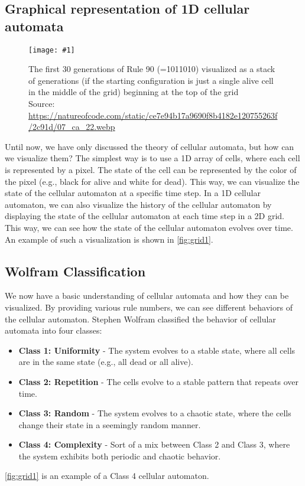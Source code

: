 \documentclass[a4paper,12pt]{llncs}
\numberwithin{equation}{section}
\newcommand{\imagewithwidth}[5]{
  \begin{figure}[htbp]%
    \begin{center}%
      \texttt{[image: \#1]}%
      \caption[#5]{#4}%
      \label{#3}%
    \end{center}%
  \end{figure}
}
\begin{document}
\subsection{Graphical representation of 1D cellular automata}
\imagewithwidth{figures/rule90}{\textwidth}{fig:grid1}{The first 30 generations of Rule 90 (=1011010) visualized as a stack of generations (if the starting configuration is just a single alive cell in the middle of the grid) beginning at the top of the grid\\Source: \url{https://natureofcode.com/static/ce7e94b17a9690f8b4182e120755263f/2c91d/07_ca_22.webp}}{}
Until now, we have only discussed the theory of cellular automata, but how can we visualize them?
The simplest way is to use a 1D array of cells, where each cell is represented by a pixel.
The state of the cell can be represented by the color of the pixel (e.g., black for alive and white for dead).
This way, we can visualize the state of the cellular automaton at a specific time step.
In a 1D cellular automaton, we can also visualize the history of the cellular automaton by displaying the state of the cellular automaton at each time step in a 2D grid.
This way, we can see how the state of the cellular automaton evolves over time.
An example of such a visualization is shown in \autoref{fig:grid1}.
\clearpage
\subsection{Wolfram Classification}
We now have a basic understanding of cellular automata and how they can be visualized.
By providing various rule numbers, we can see different behaviors of the cellular automaton.
Stephen Wolfram classified the behavior of cellular automata into four classes:
\begin{itemize}
  \item \textbf{Class 1: Uniformity} - The system evolves to a stable state, where all cells are in the same state (e.g., all dead or all alive).
  \item \textbf{Class 2: Repetition} - The cells evolve to a stable pattern that repeats over time.
  \item \textbf{Class 3: Random} - The system evolves to a chaotic state, where the cells change their state in a seemingly random manner.
  \item \textbf{Class 4: Complexity} - Sort of a mix between Class 2 and Class 3, where the system exhibits both periodic and chaotic behavior.
\end{itemize}
\autoref{fig:grid1} is an example of a Class 4 cellular automaton.
\end{document}
